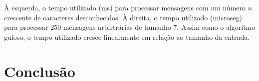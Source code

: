 \documentclass[a4paper,12pt,titlepage]{article}
\begin{document}
À esquerda, o tempo utilizado (ms) para processar mensagens com um número $n$ crescente de caracteres desconhecidos. À direita, o tempo utilizado (microseg) para processar 250 mensagens arbirtrárias de tamanho 7. Assim como o algoritmo guloso, o tempo utilizado cresce linearmente em relação ao tamanho da entrada.

\section{Conclusão}

\end{document}
